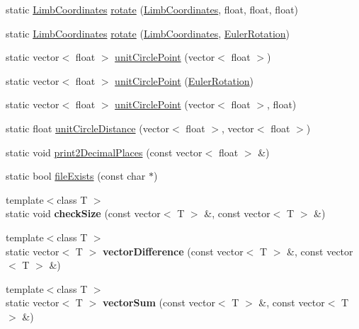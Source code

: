 \begin{DoxyCompactItemize}
\item 
static \hyperlink{structLimbCoordinates}{LimbCoordinates} \hyperlink{classHelper_a9baf1a3c1e905f4c0a6eab636dfb49cc}{rotate} (\hyperlink{structLimbCoordinates}{LimbCoordinates}, float, float, float)
\item 
static \hyperlink{structLimbCoordinates}{LimbCoordinates} \hyperlink{classHelper_a5a2e9dd4a8aee4800d0da513290c4ccc}{rotate} (\hyperlink{structLimbCoordinates}{LimbCoordinates}, \hyperlink{structEulerRotation}{EulerRotation})
\item 
static vector$<$ float $>$ \hyperlink{classHelper_a116f977e6308bd37ce24793969b4492a}{unitCirclePoint} (vector$<$ float $>$)
\item 
static vector$<$ float $>$ \hyperlink{classHelper_a595867363dc9fb28e03031b6c0137bf8}{unitCirclePoint} (\hyperlink{structEulerRotation}{EulerRotation})
\item 
static vector$<$ float $>$ \hyperlink{classHelper_afa41ef859921304ac59f929d1fd2d198}{unitCirclePoint} (vector$<$ float $>$, float)
\item 
static float \hyperlink{classHelper_ae8648fd390b8435d8cd26cfcee334432}{unitCircleDistance} (vector$<$ float $>$, vector$<$ float $>$)
\item 
static void \hyperlink{classHelper_ad062c1e9734c97ad2b6ed84ad9bb6bf5}{print2DecimalPlaces} (const vector$<$ float $>$ \&)
\item 
static bool \hyperlink{classHelper_a2ba49d32f8786d3ce542430fcad21c4b}{fileExists} (const char $\ast$)
\item 
\hypertarget{classHelper_a4289e57230265e053a02b3b7c8101653}{
{\footnotesize template$<$class T $>$ }\\static void {\bfseries checkSize} (const vector$<$ T $>$ \&, const vector$<$ T $>$ \&)}
\label{classHelper_a4289e57230265e053a02b3b7c8101653}

\item 
\hypertarget{classHelper_a326a6c6f5b0d142690552099f5da4122}{
{\footnotesize template$<$class T $>$ }\\static vector$<$ T $>$ {\bfseries vectorDifference} (const vector$<$ T $>$ \&, const vector$<$ T $>$ \&)}
\label{classHelper_a326a6c6f5b0d142690552099f5da4122}

\item 
\hypertarget{classHelper_a09844a4433617bfe28f66ab3aba9c4af}{
{\footnotesize template$<$class T $>$ }\\static vector$<$ T $>$ {\bfseries vectorSum} (const vector$<$ T $>$ \&, const vector$<$ T $>$ \&)}
\label{classHelper_a09844a4433617bfe28f66ab3aba9c4af}


\end{DoxyCompactItemize}

